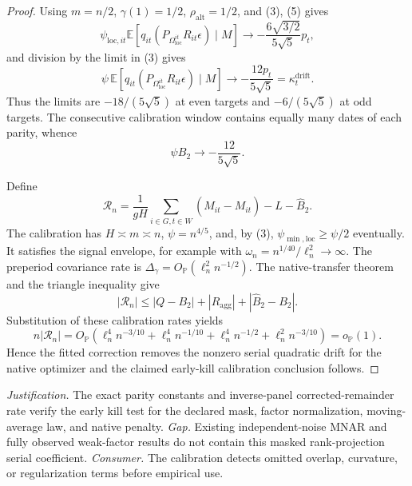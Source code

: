 \documentclass{article}
\begin{document}
\begin{proof}
Using \(m=n/2\), \(\gamma(1)=1/2\), \(\rho_{\mathrm{alt}}=1/2\), and (3), (5) gives
\[
 \psi_{\mathrm{loc},it}
 \mathbb E[q_{it}(P_{\Omega_{\mathrm{loc}}^{it}}R_{it}\epsilon)\mid M]
 \longrightarrow-\frac{6\sqrt{3/2}}{5\sqrt5}p_t,
 \tag{6}
\]
and division by the limit in (3) gives
\[
 \psi\,\mathbb E[q_{it}(P_{\Omega_{\mathrm{loc}}^{it}}R_{it}\epsilon)\mid M]
 \longrightarrow-\frac{12p_t}{5\sqrt5}=\kappa_t^{\mathrm{drift}}.
 \tag{7}
\]
Thus the limits are \(-18/(5\sqrt5)\) at even targets and \(-6/(5\sqrt5)\) at odd targets.  The consecutive calibration window contains equally many dates of each parity, whence
\[
 \psi B_2\longrightarrow-\frac{12}{5\sqrt5}.
 \tag{8}
\]

Define
\[
 \mathcal R_n=\frac1{gH}\sum_{i\in G,t\in W}(\widehat M_{it}-M_{it})-L-\widehat B_2.
\]
The calibration has \(H\asymp m\asymp n\), \(\psi=n^{4/5}\), and, by (3), \(\psi_{\min,\mathrm{loc}}\ge\psi/2\) eventually.  It satisfies the signal envelope, for example with \(\omega_n=n^{1/40}/\ell_n^2\to\infty\).  The preperiod covariance rate is \(\Delta_\gamma=O_{\mathbb P}(\ell_n^2n^{-1/2})\).  The native-transfer theorem and the triangle inequality give
\[
 |\mathcal R_n|
 \le |Q-B_2|+|R_{\mathrm{agg}}|+|\widehat B_2-B_2|.
\]
Substitution of these calibration rates yields
\[
 n|\mathcal R_n|=O_{\mathbb P}\!\left(
 \ell_n^4n^{-3/10}+\ell_n^4n^{-1/10}
 +\ell_n^4n^{-1/2}+\ell_n^2n^{-3/10}\right)=o_{\mathbb P}(1).
 \tag{9}
\]
Hence the fitted correction removes the nonzero serial quadratic drift for the native optimizer and the claimed early-kill calibration conclusion follows.
\end{proof}
\par\smallskip\noindent \textit{Justification.} The exact parity constants and inverse-panel corrected-remainder rate verify the early kill test for the declared mask, factor normalization, moving-average law, and native penalty. \textit{Gap.} Existing independent-noise MNAR and fully observed weak-factor results do not contain this masked rank-projection serial coefficient. \textit{Consumer.} The calibration detects omitted overlap, curvature, or regularization terms before empirical use.
\end{document}
